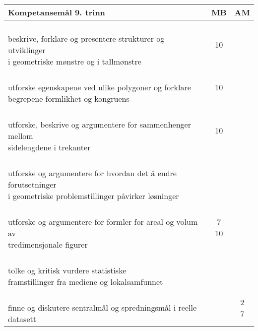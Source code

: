 \documentclass{article}
\begin{document}
\begin{center}
	\begin{tabular}{p{10.5cm} | c | c |} 
		\textbf{Kompetansemål 9. trinn} & \textbf{MB} & \textbf{AM}\\ \hline
		\shortstack[l]{\\ beskrive, forklare og presentere strukturer og utviklinger\\ i geometriske mønstre og i tallmønstre
		} &\shortstack{10\\{}} &\shortstack{} \\ \hline
		
		\shortstack[l]{\\ utforske egenskapene ved ulike polygoner og forklare\\ begrepene formlikhet og kongruens
		} &\shortstack{10\\{}} &\shortstack{} \\ \hline
		
		\shortstack[l]{\\ utforske, beskrive og argumentere for sammenhenger mellom\\ sidelengdene i trekanter
		} &\shortstack{10\\{}} &\shortstack{} \\ \hline
		
		\shortstack[l]{\\ utforske og argumentere for hvordan det å endre forutsetninger \\i geometriske problemstillinger påvirker løsninger
		} &\shortstack{10} &\shortstack{} \\ \hline
		
		\shortstack[l]{\\ utforske og argumentere for formler for areal og volum av\\ tredimensjonale figurer
		} &\shortstack{7\\10} &\shortstack{} \\ \hline
		
		\shortstack[l]{\\ tolke og kritisk vurdere statistiske \\framstillinger fra mediene og lokalsamfunnet
		} &\shortstack{} &\shortstack{2} \\ \hline
		
		\shortstack[l]{\\ finne og diskutere sentralmål og spredningsmål i reelle datasett \\\phantom{a}
		} &\shortstack{} &\shortstack{2\\7} \\ \hline
		

\end{tabular}
\end{center}
\end{document}
